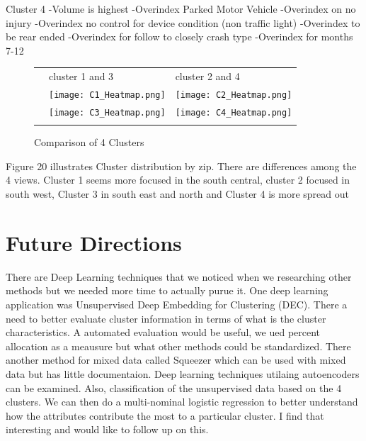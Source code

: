 \documentclass[conference]{IEEEtran}
\begin{document}
\begin{center}
Cluster 4 \linebreak
-Volume is highest 
-Overindex Parked Motor Vehicle
-Overindex on no injury 
-Overindex no control for device condition (non traffic light) 
-Overindex to be rear ended 
-Overindex for follow to closely crash type 
-Overindex for months 7-12 


\begin{figure}[h!]
	
	\caption{Comparison of 4 Clusters} %
	\bigskip
	\centering
	\begin{tabular}{@{} r @{} *{2}{M{0.13\textheight}} @{}}
	&    cluster 1 and 3 & cluster 2 and 4 \\
	\llap{\quad} & \texttt{[image: C1\_Heatmap.png]} & \texttt{[image: C2\_Heatmap.png]} \\ \addlinespace

	\llap{\quad} & \texttt{[image: C3\_Heatmap.png]} & \texttt{[image: C4\_Heatmap.png]} \\ \addlinespace
 
	\end{tabular}
	\end{figure}

Figure 20 illustrates Cluster distribution by zip.  There are differences among the 4 views. Cluster 1 seems more focused in the south central, cluster 2 focused in south west, Cluster 3 in south east and north and Cluster 4 is more spread out	

\section{Future Directions}
There are Deep Learning techniques that we noticed when we researching other methods but we needed more time to actually purue it.  One deep learning application was Unsupervised Deep Embedding for Clustering (DEC).  There a need to better evaluate cluster information in terms of what is the cluster characteristics.  A automated evaluation would be useful, we ued percent allocation as a meausure but what other methods could be standardized.  There another method for mixed data called Squeezer which can be used with mixed data but has little documentaion.  Deep learning techniques utilaing autoencoders can be examined.  Also, classification of the unsupervised data based on the 4 clusters.  We can then do a multi-nominal logistic regression to better understand how the attributes contribute the most to a particular cluster.  I find that interesting and would like to follow up on this. 

\end{center}
\end{document}
